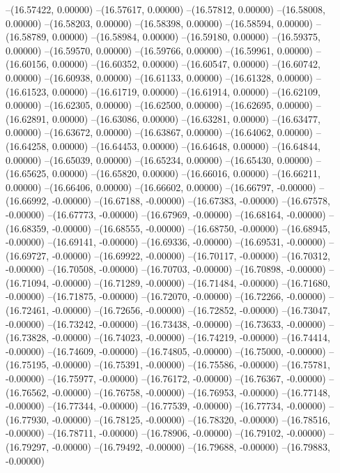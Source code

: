 --(16.57422, 0.00000)
--(16.57617, 0.00000)
--(16.57812, 0.00000)
--(16.58008, 0.00000)
--(16.58203, 0.00000)
--(16.58398, 0.00000)
--(16.58594, 0.00000)
--(16.58789, 0.00000)
--(16.58984, 0.00000)
--(16.59180, 0.00000)
--(16.59375, 0.00000)
--(16.59570, 0.00000)
--(16.59766, 0.00000)
--(16.59961, 0.00000)
--(16.60156, 0.00000)
--(16.60352, 0.00000)
--(16.60547, 0.00000)
--(16.60742, 0.00000)
--(16.60938, 0.00000)
--(16.61133, 0.00000)
--(16.61328, 0.00000)
--(16.61523, 0.00000)
--(16.61719, 0.00000)
--(16.61914, 0.00000)
--(16.62109, 0.00000)
--(16.62305, 0.00000)
--(16.62500, 0.00000)
--(16.62695, 0.00000)
--(16.62891, 0.00000)
--(16.63086, 0.00000)
--(16.63281, 0.00000)
--(16.63477, 0.00000)
--(16.63672, 0.00000)
--(16.63867, 0.00000)
--(16.64062, 0.00000)
--(16.64258, 0.00000)
--(16.64453, 0.00000)
--(16.64648, 0.00000)
--(16.64844, 0.00000)
--(16.65039, 0.00000)
--(16.65234, 0.00000)
--(16.65430, 0.00000)
--(16.65625, 0.00000)
--(16.65820, 0.00000)
--(16.66016, 0.00000)
--(16.66211, 0.00000)
--(16.66406, 0.00000)
--(16.66602, 0.00000)
--(16.66797, -0.00000)
--(16.66992, -0.00000)
--(16.67188, -0.00000)
--(16.67383, -0.00000)
--(16.67578, -0.00000)
--(16.67773, -0.00000)
--(16.67969, -0.00000)
--(16.68164, -0.00000)
--(16.68359, -0.00000)
--(16.68555, -0.00000)
--(16.68750, -0.00000)
--(16.68945, -0.00000)
--(16.69141, -0.00000)
--(16.69336, -0.00000)
--(16.69531, -0.00000)
--(16.69727, -0.00000)
--(16.69922, -0.00000)
--(16.70117, -0.00000)
--(16.70312, -0.00000)
--(16.70508, -0.00000)
--(16.70703, -0.00000)
--(16.70898, -0.00000)
--(16.71094, -0.00000)
--(16.71289, -0.00000)
--(16.71484, -0.00000)
--(16.71680, -0.00000)
--(16.71875, -0.00000)
--(16.72070, -0.00000)
--(16.72266, -0.00000)
--(16.72461, -0.00000)
--(16.72656, -0.00000)
--(16.72852, -0.00000)
--(16.73047, -0.00000)
--(16.73242, -0.00000)
--(16.73438, -0.00000)
--(16.73633, -0.00000)
--(16.73828, -0.00000)
--(16.74023, -0.00000)
--(16.74219, -0.00000)
--(16.74414, -0.00000)
--(16.74609, -0.00000)
--(16.74805, -0.00000)
--(16.75000, -0.00000)
--(16.75195, -0.00000)
--(16.75391, -0.00000)
--(16.75586, -0.00000)
--(16.75781, -0.00000)
--(16.75977, -0.00000)
--(16.76172, -0.00000)
--(16.76367, -0.00000)
--(16.76562, -0.00000)
--(16.76758, -0.00000)
--(16.76953, -0.00000)
--(16.77148, -0.00000)
--(16.77344, -0.00000)
--(16.77539, -0.00000)
--(16.77734, -0.00000)
--(16.77930, -0.00000)
--(16.78125, -0.00000)
--(16.78320, -0.00000)
--(16.78516, -0.00000)
--(16.78711, -0.00000)
--(16.78906, -0.00000)
--(16.79102, -0.00000)
--(16.79297, -0.00000)
--(16.79492, -0.00000)
--(16.79688, -0.00000)
--(16.79883, -0.00000)
